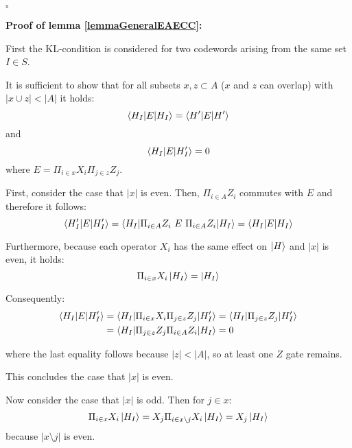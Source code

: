 \documentclass[12pt]{iopart}
\begin{document}
\begin{flushright}
$\square$
\end{flushright}


\textbf{Proof of lemma \ref{lemmaGeneralEAECC}:}


First the KL-condition is considered for  two codewords arising from the same set $I \in S$.

It is  sufficient to show that for all subsets $x, z \subset A$ ($x$ and $z$ can overlap) with $|x \cup z| < |A|$ it holds:
\begin{equation}
\braket{H_I|E|H_I} = \braket{H^\prime|E|H^\prime}
\end{equation}
and
\begin{equation}
\braket{H_I|E|H_I^\prime} = 0
\end{equation}
where $E = \Pi_{i \in x} X_i \Pi_{j \in z} Z_j$.

First, consider the case that $|x|$ is even. Then, $\Pi_{i \in A} Z_i$ commutes with $E$ and therefore it follows:
\begin{equation}
\braket{H_I^\prime|E|H_I^\prime} = \braket{H_I|\Pi_{i \in A} Z_i \ E \ \Pi_{i \in A} Z_i|H_I} =\braket{H_I|E|H_I}
\end{equation}

Furthermore, because each operator $X_i$ has the same effect on $\ket{H}$ and $|x|$ is even, it holds: 
\begin{equation}
\Pi_{i \in x} X_i \ket{H_I} = \ket{H_I}
\label{HEH=1}
\end{equation}

Consequently:
\begin{eqnarray}
\braket{H_I|E|H_I^\prime} &= \braket{H_I|\Pi_{i \in x} X_i \Pi_{j \in z} Z_j|H_I^\prime} = \braket{H_I|\Pi_{j \in z} Z_j|H_I^\prime} \nonumber \\
&= \braket{H_I|\Pi_{j \in z} Z_j \Pi_{i \in A} Z_i|H_I} = 0
\end{eqnarray}

where the last equality follows because $|z| < |A|$, so at least one $Z$ gate remains.

This concludes the case that $|x|$ is even.

Now consider the case that $|x|$ is odd. Then for $j \in x$:
\begin{equation}
\Pi_{i \in x} X_i \ket{H_I} = X_j \Pi_{i \in x \setminus j} X_i \ket{H_I} =  X_j \ket{H_I}
\end{equation}
because $|x\setminus j|$ is even.
\end{document}
